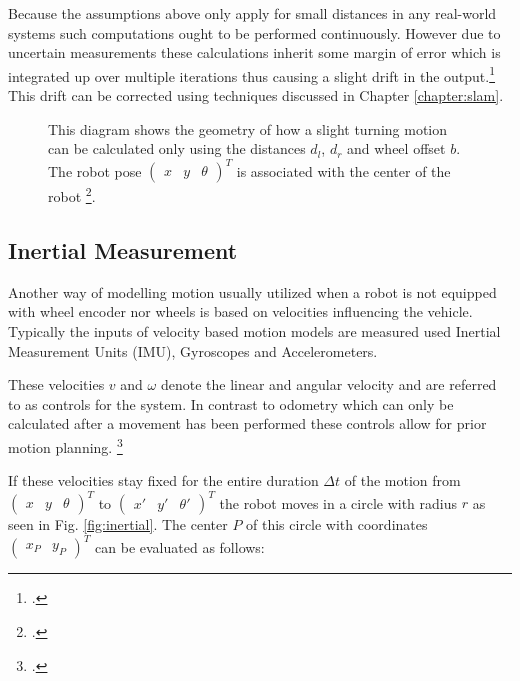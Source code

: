 Because the assumptions above only apply for small distances in any real-world systems such computations ought to be performed continuously. However due to uncertain measurements these calculations inherit some margin of error which is integrated up over multiple iterations thus causing a slight drift in the output.\footcite[Pages 69 - 77]{ben2017elements} 
This drift can be corrected using techniques discussed in Chapter \ref{chapter:slam}.

\begin{figure}
	\centering
	
	\caption{
		This diagram shows the geometry of how a slight turning motion can be calculated only using the distances $d_{l}$, $d_{r}$ and wheel offset $b$.
		The robot pose 
		$
			\begin{pmatrix}
				x &
				y &
				\theta 
			\end{pmatrix}^{T}
		$
		is associated with the center of the robot \footcite{ben2017elements}.
	}
	\label{fig:odom}
\end{figure}


\subsection{Inertial Measurement}
Another way of modelling motion usually utilized when a robot is not equipped with wheel encoder nor wheels is based on velocities influencing the vehicle. Typically the inputs of velocity based motion models are measured used Inertial Measurement Units (IMU), Gyroscopes and Accelerometers. 

These velocities $v$ and $\omega$ denote the linear and angular velocity and are referred to as controls for the system. 
In contrast to odometry which can only be calculated after a movement has been performed these controls allow for prior motion planning. \footcite[Pages 92 - 99]{thrun2002probabilisticRobotics}

If these velocities stay fixed for the entire duration $\Delta t$ of the motion from 
$\begin{pmatrix} x & y & \theta \end{pmatrix}^{T}$
to
$\begin{pmatrix} x' & y' & \theta' \end{pmatrix}^{T}$
the robot moves in a circle with radius $r$ as seen in Fig. \ref{fig:inertial}. The center $P$ of this circle with coordinates 
$
\begin{pmatrix}
	x_{P} & y_{P}
\end{pmatrix}
^{T}
$
can be evaluated as follows:


